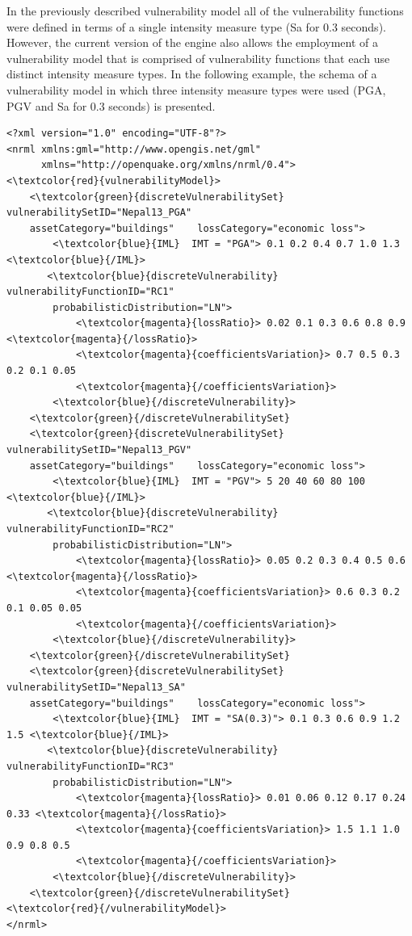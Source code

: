 In the previously described \gls{vulnerability model} all of the \glspl{vulnerability function} were defined in terms of a single intensity measure type (Sa for 0.3 seconds). However, the current version of the engine also allows the employment of a \gls{vulnerability model} that is comprised of \glspl{vulnerability function} that each use distinct intensity measure types. In the following example, the schema of a \gls{vulnerability model} in which three intensity measure types were used (PGA, PGV and Sa for 0.3 seconds) is presented.

\begin{Verbatim}[frame=single, commandchars=\\\{\}, samepage=false]
<?xml version="1.0" encoding="UTF-8"?>
<nrml xmlns:gml="http://www.opengis.net/gml"
      xmlns="http://openquake.org/xmlns/nrml/0.4">
<\textcolor{red}{vulnerabilityModel}>
    <\textcolor{green}{discreteVulnerabilitySet} vulnerabilitySetID="Nepal13_PGA"
    assetCategory="buildings"    lossCategory="economic loss">
        <\textcolor{blue}{IML}  IMT = "PGA"> 0.1 0.2 0.4 0.7 1.0 1.3 <\textcolor{blue}{/IML}>
       <\textcolor{blue}{discreteVulnerability}  vulnerabilityFunctionID="RC1"
        probabilisticDistribution="LN">
            <\textcolor{magenta}{lossRatio}> 0.02 0.1 0.3 0.6 0.8 0.9 <\textcolor{magenta}{/lossRatio}>
            <\textcolor{magenta}{coefficientsVariation}> 0.7 0.5 0.3 0.2 0.1 0.05
            <\textcolor{magenta}{/coefficientsVariation}>
        <\textcolor{blue}{/discreteVulnerability}>
    <\textcolor{green}{/discreteVulnerabilitySet}
    <\textcolor{green}{discreteVulnerabilitySet} vulnerabilitySetID="Nepal13_PGV"
    assetCategory="buildings"    lossCategory="economic loss">
        <\textcolor{blue}{IML}  IMT = "PGV"> 5 20 40 60 80 100 <\textcolor{blue}{/IML}>
       <\textcolor{blue}{discreteVulnerability}  vulnerabilityFunctionID="RC2"
        probabilisticDistribution="LN">
            <\textcolor{magenta}{lossRatio}> 0.05 0.2 0.3 0.4 0.5 0.6 <\textcolor{magenta}{/lossRatio}>
            <\textcolor{magenta}{coefficientsVariation}> 0.6 0.3 0.2 0.1 0.05 0.05
            <\textcolor{magenta}{/coefficientsVariation}>
        <\textcolor{blue}{/discreteVulnerability}>
    <\textcolor{green}{/discreteVulnerabilitySet}
    <\textcolor{green}{discreteVulnerabilitySet} vulnerabilitySetID="Nepal13_SA"
    assetCategory="buildings"    lossCategory="economic loss">
        <\textcolor{blue}{IML}  IMT = "SA(0.3)"> 0.1 0.3 0.6 0.9 1.2 1.5 <\textcolor{blue}{/IML}>
       <\textcolor{blue}{discreteVulnerability}  vulnerabilityFunctionID="RC3" 
        probabilisticDistribution="LN">
            <\textcolor{magenta}{lossRatio}> 0.01 0.06 0.12 0.17 0.24 0.33 <\textcolor{magenta}{/lossRatio}>
            <\textcolor{magenta}{coefficientsVariation}> 1.5 1.1 1.0 0.9 0.8 0.5
            <\textcolor{magenta}{/coefficientsVariation}>
        <\textcolor{blue}{/discreteVulnerability}>
    <\textcolor{green}{/discreteVulnerabilitySet}
<\textcolor{red}{/vulnerabilityModel}>
</nrml>
\end{Verbatim}

